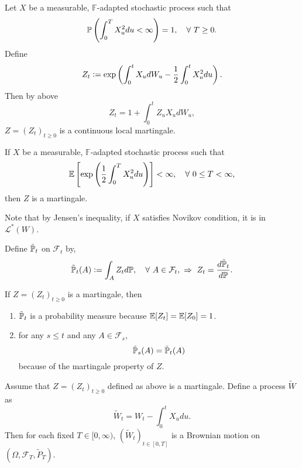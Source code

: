 \noindent Let $X$ be a measurable, $\mathbb{F}$-adapted stochastic process such that
\begin{equation*}
    \mathbb{P}\left(\int_0^T X_u^2 du < \infty\right) = 1,\quad \forall~T \geq 0.
\end{equation*}
Define
\begin{equation*}
    Z_t \vcentcolon= \exp\left(\int_0^tX_udW_u - \frac{1}{2}\int_0^tX_u^2du\right).
\end{equation*}
Then by above
\begin{equation*}
    Z_t = 1 + \int_0^tZ_uX_u dW_u,
\end{equation*}
$Z =(Z_t)_{t \geq 0}$ is a continuous local martingale.

\begin{prop}
    If $X$ be a measurable, $\mathbb{F}$-adapted stochastic process such that
    \begin{equation*}
        \mathbb{E}\left[\exp\left(\frac{1}{2} \int_0^T X_u^2 du\right)\right] < \infty,\quad \forall~ 0\leq T < \infty,
    \end{equation*}
    then $Z$ is a martingale.
\end{prop}
\begin{rmk}
    Note that by Jensen's inequality, if $X$ satisfies Novikov condition, it is in $\mathcal{L}^*(W)$.
\end{rmk}

\noindent Define $\tilde{\mathbb{P}}_t$ on $\mathcal{F}_t$ by,
\begin{equation*}
    \tilde{\mathbb{P}}_t(A) \vcentcolon= \int_A Z_t d\mathbb{P},\quad \forall~ A \in \mathcal{F}_t,~\Rightarrow~ Z_t = \frac{d\tilde{\mathbb{P}}_t}{d\mathbb{P}}.
\end{equation*}
\begin{rmk}
    If $Z = (Z_t)_{t \geq 0}$ is a martingale, then
    \begin{enumerate}[label=(\roman*)]
        \item $\tilde{\mathbb{P}}_t$ is a probability measure because $\mathbb{E}[Z_t] = \mathbb{E}[Z_0] = 1$.
        \item for any $s \leq t$ and any $A \in \mathcal{F}_s$,
        \begin{equation*}
            \tilde{\mathbb{P}}_s(A) = \tilde{\mathbb{P}}_t(A)
        \end{equation*}
        because of the martingale property of $Z$.
    \end{enumerate}
\end{rmk}

\begin{thm}
    Assume that $Z=(Z_t)_{t \geq 0}$ defined as above is a martingale. Define a process $\tilde{W}$ as
    \begin{equation*}
        \tilde{W}_t = W_t - \int_0^t X_u du.
    \end{equation*}
    Then for each fixed $T \in [0,\infty)$, $(\tilde{W}_t)_{t \in [0,T]}$ is a Brownian motion on $(\Omega,\mathcal{F}_T, \tilde{P}_T)$.
\end{thm}

